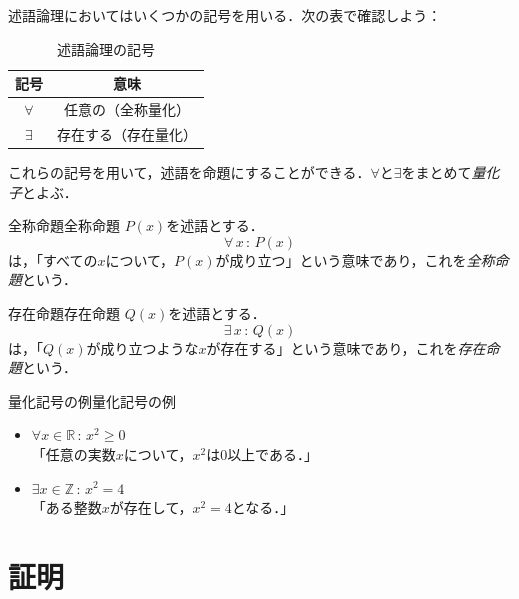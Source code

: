 述語論理においてはいくつかの記号を用いる．次の表で確認しよう：

\begin{table}[ht]
  \centering
  \caption{述語論理の記号}
  \begin{tabular}{c|c}
    \hline
    記号        & 意味                              \\
    \hline
    $\forall$ & 任意の（全称量化\index{ぜんしょうりょうか@全称量化}） \\
    $\exists$ & 存在する（存在量化\index{そんざいりょうか@存在量化}） \\
    \hline
  \end{tabular}
\end{table}

これらの記号を用いて，述語を命題にすることができる．$\forall$と$\exists$をまとめて\emph{量化子}とよぶ．

\begin{definition}{全称命題}{全称命題}
  $P(x)$を述語とする．
  \[
    \forall\, x \, : \, P(x)
  \]
  は，「すべての$x$について，$P(x)$が成り立つ」という意味であり，これを\emph{全称命題}という．
\end{definition}

\begin{definition}{存在命題}{存在命題}
  $Q(x)$を述語とする．
  \[
    \exists \,  x\, : \, Q(x)
  \]
  は，「$Q(x)$が成り立つような$x$が存在する」という意味であり，これを\emph{存在命題}という．
\end{definition}

\begin{example}{量化記号の例}{量化記号の例}
  \begin{itemize}
    \item $\forall x \in \mathbb{R}\, : \, x^2 \geq 0$\\
          「任意の実数$x$について，$x^2$は$0$以上である．」
    \item $\exists x \in \mathbb{Z} \, : \, x^2 = 4$\\
          「ある整数$x$が存在して，$x^2 = 4$となる．」
  \end{itemize}
\end{example}


\section{証明}


